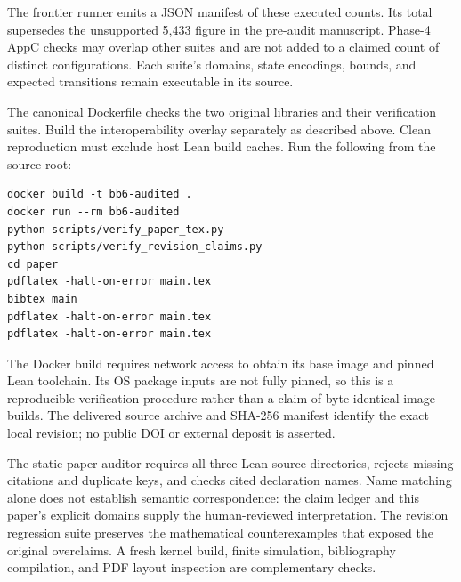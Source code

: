 \documentclass[11pt]{article}
\DeclareRobustCommand{\_}{\ifmmode\sb\else\textunderscore\allowbreak\fi}
\theoremstyle{definition}
\theoremstyle{remark}
\begin{document}
The frontier runner emits a JSON manifest of these executed counts. Its total supersedes the unsupported 5,433 figure in the pre-audit manuscript. Phase-4 AppC checks may overlap other suites and are not added to a claimed count of distinct configurations. Each suite's domains, state encodings, bounds, and expected transitions remain executable in its source.

\noindent\begin{minipage}{\linewidth}
The canonical Dockerfile checks the two original libraries and their verification suites. Build the interoperability overlay separately as described above. Clean reproduction must exclude host Lean build caches. Run the following from the source root:
\begin{lstlisting}
docker build -t bb6-audited .
docker run --rm bb6-audited
python scripts/verify_paper_tex.py
python scripts/verify_revision_claims.py
cd paper
pdflatex -halt-on-error main.tex
bibtex main
pdflatex -halt-on-error main.tex
pdflatex -halt-on-error main.tex
\end{lstlisting}
\end{minipage}
The Docker build requires network access to obtain its base image and pinned Lean toolchain. Its OS package inputs are not fully pinned, so this is a reproducible verification procedure rather than a claim of byte-identical image builds. The delivered source archive and SHA-256 manifest identify the exact local revision; no public DOI or external deposit is asserted.

The static paper auditor requires all three Lean source directories, rejects missing citations and duplicate keys, and checks cited declaration names. Name matching alone does not establish semantic correspondence: the claim ledger and this paper's explicit domains supply the human-reviewed interpretation. The revision regression suite preserves the mathematical counterexamples that exposed the original overclaims. A fresh kernel build, finite simulation, bibliography compilation, and PDF layout inspection are complementary checks.
\end{document}
